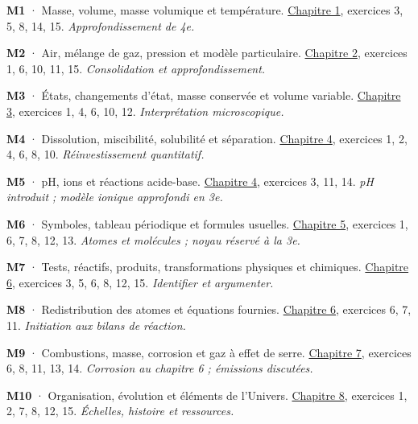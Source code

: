 \noindent\textbf{M1} · Masse, volume, masse volumique et température. \hyperref[chap-1]{Chapitre 1}, exercices 3, 5, 8, 14, 15. \emph{Approfondissement de 4e.}\par\vspace{2mm}
\noindent\textbf{M2} · Air, mélange de gaz, pression et modèle particulaire. \hyperref[chap-2]{Chapitre 2}, exercices 1, 6, 10, 11, 15. \emph{Consolidation et approfondissement.}\par\vspace{2mm}
\noindent\textbf{M3} · États, changements d’état, masse conservée et volume variable. \hyperref[chap-3]{Chapitre 3}, exercices 1, 4, 6, 10, 12. \emph{Interprétation microscopique.}\par\vspace{2mm}
\noindent\textbf{M4} · Dissolution, miscibilité, solubilité et séparation. \hyperref[chap-4]{Chapitre 4}, exercices 1, 2, 4, 6, 8, 10. \emph{Réinvestissement quantitatif.}\par\vspace{2mm}
\noindent\textbf{M5} · pH, ions et réactions acide-base. \hyperref[chap-4]{Chapitre 4}, exercices 3, 11, 14. \emph{pH introduit ; modèle ionique approfondi en 3e.}\par\vspace{2mm}
\noindent\textbf{M6} · Symboles, tableau périodique et formules usuelles. \hyperref[chap-5]{Chapitre 5}, exercices 1, 6, 7, 8, 12, 13. \emph{Atomes et molécules ; noyau réservé à la 3e.}\par\vspace{2mm}
\noindent\textbf{M7} · Tests, réactifs, produits, transformations physiques et chimiques. \hyperref[chap-6]{Chapitre 6}, exercices 3, 5, 6, 8, 12, 15. \emph{Identifier et argumenter.}\par\vspace{2mm}
\noindent\textbf{M8} · Redistribution des atomes et équations fournies. \hyperref[chap-6]{Chapitre 6}, exercices 6, 7, 11. \emph{Initiation aux bilans de réaction.}\par\vspace{2mm}
\noindent\textbf{M9} · Combustions, masse, corrosion et gaz à effet de serre. \hyperref[chap-7]{Chapitre 7}, exercices 6, 8, 11, 13, 14. \emph{Corrosion au chapitre 6 ; émissions discutées.}\par\vspace{2mm}
\noindent\textbf{M10} · Organisation, évolution et éléments de l’Univers. \hyperref[chap-8]{Chapitre 8}, exercices 1, 2, 7, 8, 12, 15. \emph{Échelles, histoire et ressources.}\par\vspace{2mm}
